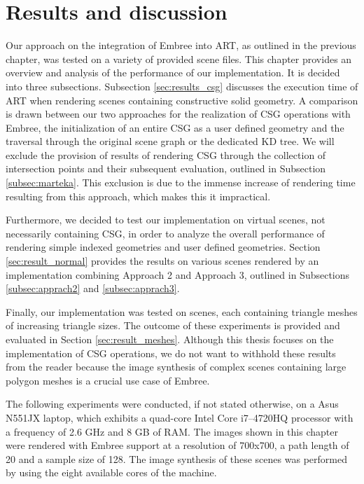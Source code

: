 \chapter{Results and discussion}
\label{chap:results}

Our approach on the integration of Embree into ART, as outlined in the previous chapter, was tested on a variety of provided scene files. This chapter provides an overview and analysis of the performance of our implementation. It is decided into three subsections. Subsection \ref{sec:results_csg} discusses the execution time of ART when rendering scenes containing constructive solid geometry. A comparison is drawn between our two approaches for the realization of CSG operations with Embree, the initialization of an entire CSG as a user defined geometry and the traversal through the original scene graph or the dedicated KD tree. We will exclude the provision of results of rendering CSG through the collection of intersection points and their subsequent evaluation, outlined in Subsection \ref{subsec:marteka}. This exclusion is due to the immense increase of rendering time resulting from this approach, which makes this it impractical.

Furthermore, we decided to test our implementation on virtual scenes, not necessarily containing CSG, in order to analyze the overall performance of rendering simple indexed geometries and user defined geometries. Section \ref{sec:result_normal} provides the results on various scenes rendered by an implementation combining Approach 2 and Approach 3, outlined in Subsections \ref{subsec:apprach2} and \ref{subsec:apprach3}. 

Finally, our implementation was tested on scenes, each containing triangle meshes of increasing triangle sizes. The outcome of these experiments is provided and evaluated in Section \ref{sec:result_meshes}. Although this thesis focuses on the implementation of CSG operations, we do not want to withhold these results from the reader because the image synthesis of complex scenes containing large polygon meshes is a crucial use case of Embree.

The following experiments were conducted, if not stated otherwise, on a Asus N551JX laptop, which exhibits a quad-core Intel Core i7–4720HQ processor with a frequency of 2.6 GHz and 8 GB of RAM. The images shown in this chapter were rendered with Embree support at a resolution of 700x700, a path length of 20 and a sample size of 128. The image synthesis of these scenes was performed by using the eight available cores of the machine.

